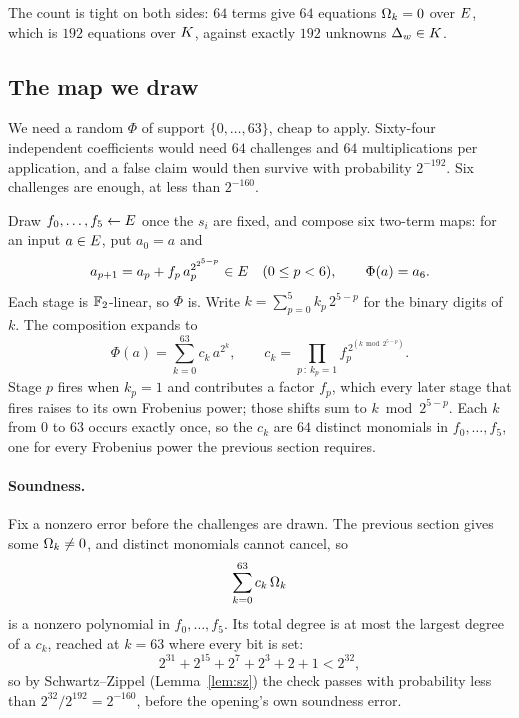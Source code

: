The count is tight on both sides: $64$ terms give $64$ equations $\Omega_k=0$ over $E$, which is $192$ equations over $K$, against exactly $192$ unknowns $\Delta_w\in K$.

\subsection{The map we draw}\label{rs:map}

We need a random $\Phi$ of support $\{0,\dots,63\}$, cheap to apply. Sixty-four independent coefficients would need $64$ challenges and $64$ multiplications per application, and a false claim would then survive with probability $2^{-192}$. Six challenges are enough, at less than $2^{-160}$.

Draw $f_0,\dots,f_5\leftarrow E$ once the $s_i$ are fixed, and compose six two-term maps: for an input $a\in E$, put $a_0=a$ and
\begin{equation}
a_{p+1}=a_p+f_p\,a_p^{2^{2^{5-p}}}\in E\quad(0\le p<6),
\qquad
\Phi(a)=a_6.
\label{eq:phi}
\end{equation}
Each stage is $\mathbb{F}_2$-linear, so $\Phi$ is. Write $k=\sum_{p=0}^{5}k_p\,2^{5-p}$ for the binary digits of $k$. The composition expands to
\begin{equation}
\Phi(a)=\sum_{k=0}^{63}c_k\,a^{2^k},
\qquad
c_k=\prod_{p\,:\,k_p=1}f_p^{\,2^{(k\bmod 2^{5-p})}}.
\label{eq:ck}
\end{equation}
Stage $p$ fires when $k_p=1$ and contributes a factor $f_p$, which every later stage that fires raises to its own Frobenius power; those shifts sum to $k\bmod 2^{5-p}$. Each $k$ from $0$ to $63$ occurs exactly once, so the $c_k$ are $64$ distinct monomials in $f_0,\dots,f_5$, one for every Frobenius power the previous section requires.

\paragraph{Soundness.} Fix a nonzero error before the challenges are drawn. The previous section gives some $\Omega_k\neq0$, and distinct monomials cannot cancel, so
\[
\sum_{k=0}^{63}c_k\,\Omega_k
\]
is a nonzero polynomial in $f_0,\dots,f_5$. Its total degree is at most the largest degree of a $c_k$, reached at $k=63$ where every bit is set:
\[
2^{31}+2^{15}+2^7+2^3+2+1<2^{32},
\]
so by Schwartz--Zippel (Lemma~\ref{lem:sz}) the check passes with probability less than $2^{32}/2^{192}=2^{-160}$, before the opening's own soundness error.

